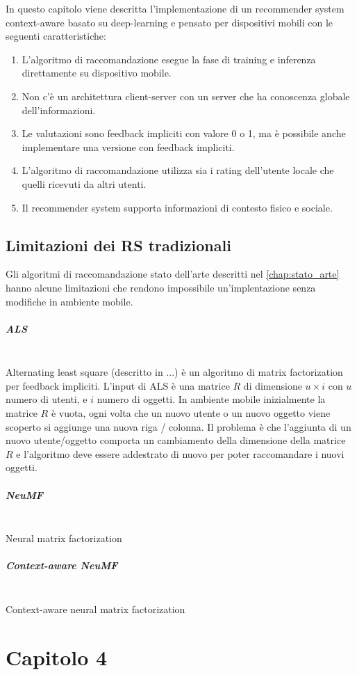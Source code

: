 \documentclass[12pt,italian]{report}
\newcommand{\myparagraph}[1]{\paragraph{#1}\mbox{}\\}
\begin{document}
In questo capitolo viene descritta l'implementazione di un recommender system context-aware basato su deep-learning e pensato per dispositivi mobili con le seguenti caratteristiche:
\begin{enumerate}
 \item L'algoritmo di raccomandazione esegue la fase di training e inferenza direttamente su dispositivo mobile.
 
  \item Non c'è un architettura client-server con un server che ha conoscenza globale dell'informazioni.
  \item Le valutazioni sono feedback impliciti con valore 0 o 1, ma è possibile anche implementare una versione con feedback impliciti.
  \item L'algoritmo di raccomandazione utilizza sia i rating dell'utente locale che quelli ricevuti da altri utenti.
  \item Il recommender system supporta informazioni di contesto fisico e sociale.
\end{enumerate}


\section{Limitazioni dei RS tradizionali}
Gli algoritmi di raccomandazione stato dell'arte descritti nel \autoref{chap:stato_arte} hanno alcune limitazioni che rendono impossibile un'implentazione senza modifiche in ambiente mobile.

\myparagraph{ALS}
Alternating least square (descritto in ...) è un algoritmo di matrix factorization per feedback impliciti. L'input di ALS è una matrice $R$ di dimensione $u \times i$ con $u$ numero di utenti, e $i$ numero di oggetti. In ambiente mobile inizialmente la matrice $R$ è vuota, ogni volta che un nuovo utente o un nuovo oggetto viene scoperto si aggiunge una nuova riga / colonna. Il problema è che l'aggiunta di un nuovo utente/oggetto comporta un cambiamento della dimensione della matrice $R$ e l'algoritmo deve essere addestrato di nuovo per poter raccomandare i nuovi oggetti. 

\myparagraph{NeuMF}
Neural matrix factorization

\myparagraph{Context-aware NeuMF}
Context-aware neural matrix factorization



% 
% 

\chapter{Capitolo 4}
\label{chap:datasets}
\end{document}
